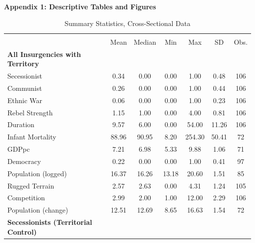 \documentclass[12pt, letterpaper]{article}
\begin{document}
\begin{center}
\Large{\textbf{Appendix 1: Descriptive Tables and Figures}}

\let\cleardoublepage\clearpage
\begin{table}[htbp]
\def\sym#1{\ifmmode^{#1}\else\(^{#1}\)\fi}
\setcounter{table}{0}
\renewcommand\thetable{A.\Roman{table}}
\caption{Summary Statistics, Cross-Sectional Data}
\begin{tabular}{l*{1}{cccccc}}
\hline\hline
                    &\multicolumn{6}{c}{}                                                         \\
                    &        Mean&         Median&         Min&         Max&          SD&       Obs.\\
\hline
\textbf{All Insurgencies with Territory} \\
Secessionist        &        0.34&        0.00&        0.00&        1.00&        0.48&         106\\
Communist           &        0.26&        0.00&        0.00&        1.00&        0.44&         106\\
Ethnic War          &        0.06&        0.00&        0.00&        1.00&        0.23&         106\\
Rebel Strength      &        1.15&        1.00&        0.00&        4.00&        0.81&         106\\
Duration            &        9.57&        6.00&        0.00&       54.00&       11.26&         106\\
Infant Mortality    &       88.96&       90.95&        8.20&      254.30&       50.41&          72\\
GDPpc               &        7.21&        6.98&        5.33&        9.88&        1.06&          71\\
Democracy           &        0.22&        0.00&        0.00&        1.00&        0.41&          97\\
Population (logged) &       16.37&       16.26&       13.18&       20.60&        1.51&          85\\
Rugged Terrain      &        2.57&        2.63&        0.00&        4.31&        1.24&         105\\
Competition         &        2.99&        2.00&        1.00&       12.00&        2.29&         106\\
Population (change) &       12.51&       12.69&        8.65&       16.63&        1.54&          72\\\hline
\textbf{Secessionists (Territorial Control)} \\

\end{tabular}
\end{table}
\end{center}
\end{document}
